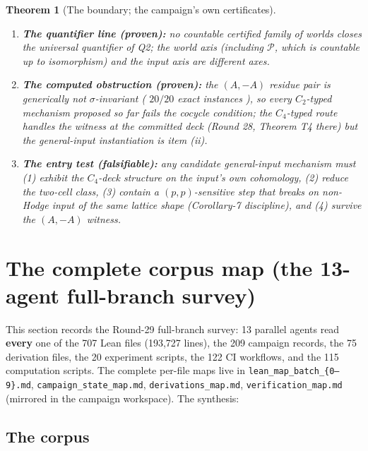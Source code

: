\documentclass[11pt]{article}
\newtheorem{theorem}{Theorem}[section]
\begin{document}
\begin{theorem}[The boundary; the campaign's own certificates]\label{thm:boundary}
\leavevmode
\begin{enumerate}
\item \textbf{The quantifier line (proven):} no countable certified family
of worlds closes the universal quantifier of Q2; the world axis
(including $\mathcal P$, which is countable up to isomorphism) and the
input axis are different axes.
\item \textbf{The computed obstruction (proven):} the $(A,-A)$ residue pair
is generically not $\sigma$-invariant ( $20/20$ exact instances ), so every
$C_2$-typed mechanism proposed so far fails the cocycle condition; the
$C_4$-typed route handles the witness at the committed deck (Round 28,
Theorem T4 there) but the general-input instantiation is item (ii).
\item \textbf{The entry test (falsifiable):} any candidate general-input
mechanism must (1) exhibit the $C_4$-deck structure on the input's own
cohomology, (2) reduce the two-cell class, (3) contain a $(p,p)$-sensitive
step that breaks on non-Hodge input of the same lattice shape
(Corollary-7 discipline), and (4) survive the $(A,-A)$ witness.
\end{enumerate}
\end{theorem}

\section{The complete corpus map (the 13-agent full-branch survey)}
\label{sec:map}

This section records the Round-29 full-branch survey: 13 parallel agents
read \textbf{every} one of the 707 Lean files (193{,}727 lines), the 209
campaign records, the 75 derivation files, the 20 experiment scripts, the
122 CI workflows, and the 115 computation scripts. The complete per-file
maps live in \texttt{lean\_map\_batch\_\{0--9\}.md},
\texttt{campaign\_state\_map.md}, \texttt{derivations\_map.md},
\texttt{verification\_map.md} (mirrored in the campaign workspace). The
synthesis:

\subsection{The corpus}
\end{document}
